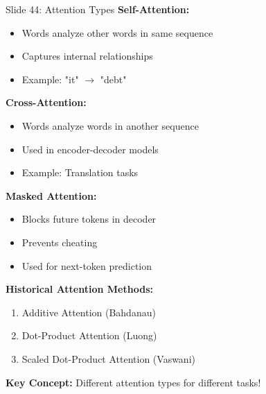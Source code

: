 \documentclass[8pt]{beamer}
\begin{document}
	\begin{frame}{Slide 44: Attention Types}
		\fontsize{6.5}{7.5}\selectfont
		\textbf{Self-Attention:}
		\begin{itemize}
			\item Words analyze other words in same sequence
			\item Captures internal relationships
			\item Example: "it" $\to$ "debt"
		\end{itemize}
		
		\vspace{0.1cm}
		\textbf{Cross-Attention:}
		\begin{itemize}
			\item Words analyze words in another sequence
			\item Used in encoder-decoder models
			\item Example: Translation tasks
		\end{itemize}
		
		\vspace{0.1cm}
		\textbf{Masked Attention:}
		\begin{itemize}
			\item Blocks future tokens in decoder
			\item Prevents cheating
			\item Used for next-token prediction
		\end{itemize}
		
		\vspace{0.1cm}
		\textbf{Historical Attention Methods:}
		\begin{enumerate}
			\item Additive Attention (Bahdanau)
			\item Dot-Product Attention (Luong)
			\item Scaled Dot-Product Attention (Vaswani)
		\end{enumerate}
		
		\textcolor{myblue}{\textbf{Key Concept:}} Different attention types for different tasks!
	\end{frame}
	
\end{document}
